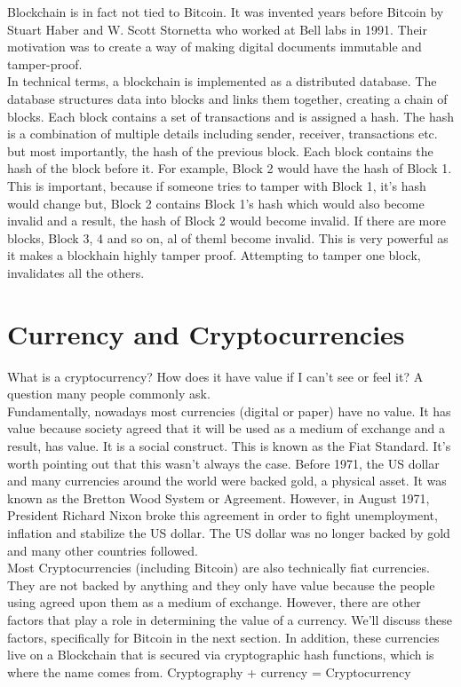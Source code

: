 \documentclass[11pt]{article} %
\begin{document}
\noindent Blockchain is in fact not tied to Bitcoin. It was invented years before Bitcoin by Stuart Haber and W. Scott Stornetta who worked at Bell labs in 1991. Their motivation was to create a way of making digital documents immutable and tamper-proof. \\

\noindent In technical terms, a blockchain is implemented as a distributed database. The database structures data into blocks and links them together, creating a chain of blocks. Each block contains a set of transactions and is assigned a hash. The hash is a combination of multiple details including sender, receiver, transactions etc.  but most importantly, the hash of the previous block. Each block contains the hash of the block before it. For example, Block 2 would have the hash of Block 1. This is important, because if someone tries to tamper with Block 1, it's hash would change but, Block 2 contains Block 1's hash which would also become invalid and a result, the hash of Block 2 would become invalid. If there are more blocks, Block 3, 4 and so on, al of theml become invalid. This is very powerful as it makes a blockhain highly tamper proof. Attempting to tamper one block, invalidates all the others. \\

\section{Currency and Cryptocurrencies}{}
What is a cryptocurrency? How does it have value if I can't see or feel it? A question many people commonly ask.\\


\noindent Fundamentally, nowadays most currencies (digital or paper) have no value. It has value because society agreed that it will be used as a medium of exchange and a result, has value. It is a social construct. This is known as the Fiat Standard. It's worth pointing out that this wasn't always the case. Before 1971, the US dollar and many currencies around the world were backed gold, a physical asset. It was known as the Bretton Wood System or Agreement. However, in August 1971, President Richard Nixon broke this agreement in order to fight unemployment, inflation and stabilize the US dollar. The US dollar was no longer backed by gold and many other countries followed.\\


\noindent Most Cryptocurrencies (including Bitcoin) are also technically fiat currencies. They are not backed by anything and they only have value because the people using agreed upon them as a medium of exchange. However, there are other factors that play a role in determining the value of a currency. We'll discuss these factors, specifically for Bitcoin in the next section. In addition, these currencies live on a Blockchain that is secured via cryptographic hash functions, which is where the name comes from. Cryptography + currency = Cryptocurrency\\
\end{document}
